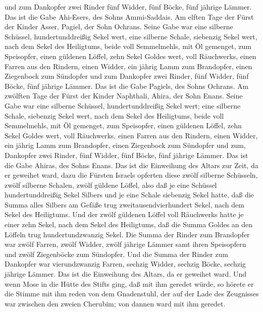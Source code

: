 und zum Dankopfer zwei Rinder fünf Widder, fünf Böcke, fünf jährige
Lämmer. Das ist die Gabe Ahi-Esers, des Sohns Ammi-Saddais.
 Am elften Tage der Fürst der Kinder Asser, Pagiel, der
Sohn Ochrans.  Seine Gabe war eine silberne Schüssel,
hundertunddreißig Sekel wert, eine silberne Schale, siebenzig Sekel
wert, nach dem Sekel des Heiligtums, beide voll Semmelmehls, mit Öl
gemenget, zum Speisopfer,  einen güldenen Löffel, zehn
Sekel Goldes wert, voll Räuchwerks,  einen Farren aus den
Rindern, einen Widder, ein jährig Lamm zum Brandopfer, 
einen Ziegenbock zum Sündopfer  und zum Dankopfer zwei
Rinder, fünf Widder, fünf Böcke, fünf jährige Lämmer. Das ist die Gabe
Pagiels, des Sohns Ochrans.  Am zwölften Tage der Fürst der
Kinder Naphthali, Ahira, der Sohn Enans.  Seine Gabe war
eine silberne Schüssel, hundertunddreißig Sekel wert; eine silberne
Schale, siebenzig Sekel wert, nach dem Sekel des Heiligtums, beide voll
Semmelmehls, mit Öl gemenget, zum Speisopfer,  einen
güldenen Löffel, zehn Sekel Goldes wert, voll Räuchwerks, 
einen Farren aus den Rindern, einen Widder, ein jährig Lamm zum
Brandopfer,  einen Ziegenbock zum Sündopfer 
und zum, Dankopfer zwei Rinder, fünf Widder, fünf Böcke, fünf jährige
Lämmer. Das ist die Gabe Ahiras, des Sohns Enans.  Das ist
die Einweihung des Altars zur Zeit, da er geweihet ward, dazu die
Fürsten Israels opferten diese zwölf silberne Schüsseln, zwölf silberne
Schalen, zwölf güldene Löffel,  also daß je eine Schüssel
hundertunddreißig Sekel Silbers und je eine Schale siebenzig Sekel
hatte, daß die Summa alles Silbers am Gefäße trug zweitausendvierhundert
Sekel, nach dem Sekel des Heiligtums.  Und der zwölf
güldenen Löffel voll Räuchwerks hatte je einer zehn Sekel, nach dem
Sekel des Heiligtums, daß die Summa Goldes an den Löffeln trug
hundertundzwanzig Sekel.  Die Summa der Rinder zum
Brandopfer war zwölf Farren, zwölf Widder, zwölf jährige Lämmer samt
ihren Speisopfern und zwölf Ziegenböcke zum Sündopfer.  Und
die Summa der Rinder zum Dankopfer war vierundzwanzig Farren, sechzig
Widder, sechzig Böcke, sechzig jährige Lämmer. Das ist die Einweihung
des Altars, da er geweihet ward.  Und wenn Mose in die
Hütte des Stifts ging, daß mit ihm geredet würde, so hörete er die
Stimme mit ihm reden von dem Gnadenstuhl, der auf der Lade des
Zeugnisses war zwischen den zweien Cherubim; von dannen ward mit ihm
geredet.

